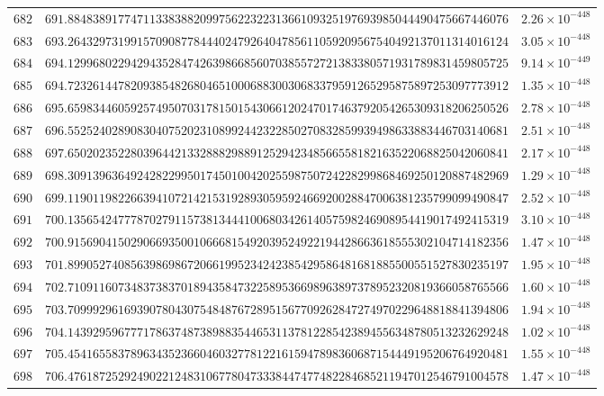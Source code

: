\documentclass[12pt,reqno]{amsart}
\theoremstyle{remark}
\begin{document}
\begin{longtable}{clc}
$682$ & $691.8848389177471133838820997562232231366109325197693985044490475667446076$ & $2.26\times 10^{-448}$ \\
$683$ & $693.2643297319915709087784440247926404785611059209567540492137011314016124$ & $3.05\times 10^{-448}$ \\
$684$ & $694.1299680229429435284742639866856070385572721383380571931789831459805725$ & $9.14\times 10^{-449}$ \\
$685$ & $694.7232614478209385482680465100068830030683379591265295875897253097773912$ & $1.35\times 10^{-448}$ \\
$686$ & $695.6598344605925749507031781501543066120247017463792054265309318206250526$ & $2.78\times 10^{-448}$ \\
$687$ & $696.5525240289083040752023108992442322850270832859939498633883446703140681$ & $2.51\times 10^{-448}$ \\
$688$ & $697.6502023522803964421332888298891252942348566558182163522068825042060841$ & $2.17\times 10^{-448}$ \\
$689$ & $698.3091396364924282299501745010042025598750724228299868469250120887482969$ & $1.29\times 10^{-448}$ \\
$690$ & $699.1190119822663941072142153192893059592466920028847006381235799099490847$ & $2.52\times 10^{-448}$ \\
$691$ & $700.1356542477787027911573813444100680342614057598246908954419017492415319$ & $3.10\times 10^{-448}$ \\
$692$ & $700.9156904150290669350010666815492039524922194428663618555302104714182356$ & $1.47\times 10^{-448}$ \\
$693$ & $701.8990527408563986986720661995234242385429586481681885500551527830235197$ & $1.95\times 10^{-448}$ \\
$694$ & $702.7109116073483738370189435847322589536698963897378952320819366058765566$ & $1.60\times 10^{-448}$ \\
$695$ & $703.7099929616939078043075484876728951567709262847274970229648818841394806$ & $1.94\times 10^{-448}$ \\
$696$ & $704.1439295967771786374873898835446531137812285423894556348780513232629248$ & $1.02\times 10^{-448}$ \\
$697$ & $705.4541655837896343523660460327781221615947898360687154449195206764920481$ & $1.55\times 10^{-448}$ \\
$698$ & $706.4761872529249022124831067780473338447477482284685211947012546791004578$ & $1.47\times 10^{-448}$ \\

\end{longtable}
\end{document}
